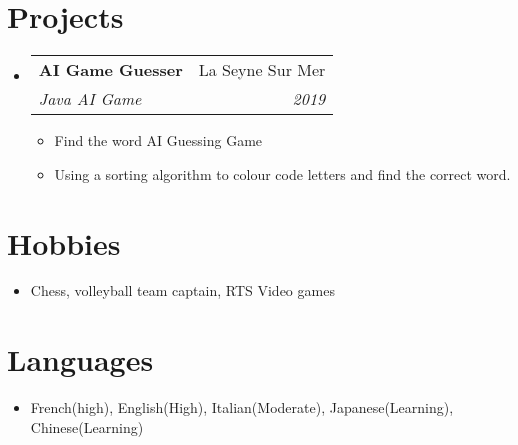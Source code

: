\documentclass[letterpaper,11pt]{article}
\makeatletter
\newcommand{\resumeItem}[2]{
  \item\small{
    \textbf{#1}{#2 \vspace{-2pt}}
  }
}
\newcommand{\resumeSubheading}[4]{
  \vspace{-1pt}\item
    \begin{tabular*}{0.97\textwidth}[t]{l@{\extracolsep{\fill}}r}
      \textbf{#1} & #2 \\
      \textit{\small#3} & \textit{\small #4} \\
    \end{tabular*}\vspace{-5pt}
}
\newcommand{\resumeSubHeadingListStart}{\begin{itemize}[leftmargin=*]}
\newcommand{\resumeSubHeadingListEnd}{\end{itemize}}
\newcommand{\resumeItemListStart}{\begin{itemize}}
\newcommand{\resumeItemListEnd}{\end{itemize}\vspace{-5pt}}
\makeatother
\begin{document}
\section{Projects}
  \resumeSubHeadingListStart
	\resumeSubheading
	{AI Game Guesser}{La Seyne Sur Mer}
	{Java AI Game}{2019}
		\resumeItemListStart
			\resumeItem{}
			{Find the word AI Guessing Game}
			\resumeItem{}
			{Using a sorting algorithm to colour code letters and find the correct word.}
		\resumeItemListEnd
\resumeSubHeadingListEnd


\section{Hobbies}
	\resumeSubHeadingListStart
	\item{
	\textbf{}{Chess, volleyball team captain, RTS Video games}
	}
	\resumeSubHeadingListEnd
  
\section{Languages}
	\resumeSubHeadingListStart
	\item{
	\textbf{}{French(high), English(High), Italian(Moderate), Japanese(Learning), Chinese(Learning)}
	}
	\resumeSubHeadingListEnd
\end{document}
